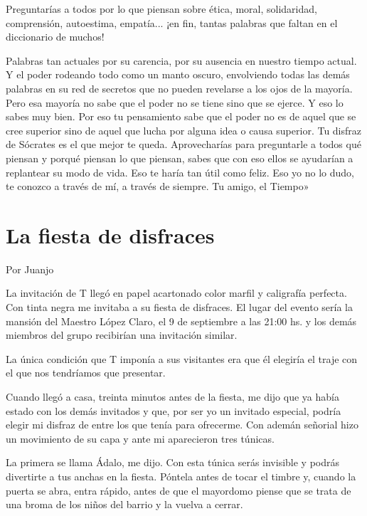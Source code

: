 \documentclass[11pt,twoside,openright,a5paper]{book}
\begin{document}
Preguntarías a todos por lo que piensan sobre ética, moral, solidaridad, comprensión, autoestima, empatía... ¡en fin, tantas palabras que faltan en el diccionario de muchos! 

Palabras tan actuales por su carencia, por su ausencia en nuestro tiempo actual. Y el poder rodeando todo como un manto oscuro, envolviendo todas las demás palabras en su red de secretos que no pueden revelarse a los ojos de la mayoría. Pero esa mayoría no sabe que el poder no se tiene sino que se ejerce. Y eso lo sabes muy bien. Por eso tu pensamiento sabe que el poder no es de aquel que se cree superior sino de aquel que lucha por alguna idea o causa superior. Tu disfraz de Sócrates es el que mejor te queda. Aprovecharías para preguntarle a todos qué piensan y porqué piensan lo que piensan, sabes que con eso ellos se ayudarían a replantear  su modo de vida. Eso te haría tan útil como feliz.  Eso yo no lo dudo, te conozco a través de mí, a través de  siempre. Tu amigo, el Tiempo»

\section*{La fiesta de disfraces}

                                                                                    \begin{flushright}Por Juanjo\end{flushright}

La invitación de T llegó en papel acartonado color marfil y caligrafía perfecta. Con tinta negra me invitaba a su fiesta de disfraces. El lugar del evento sería la mansión del Maestro López Claro, el 9 de septiembre a las 21:00 hs. y los demás miembros del grupo recibirían una invitación similar.

La única condición que T imponía a sus visitantes era que él elegiría el traje con el que nos tendríamos que presentar.

Cuando llegó a casa, treinta minutos antes de la fiesta, me dijo que ya había estado con los demás invitados y que, por ser yo un invitado especial, podría elegir mi disfraz de entre los que tenía para ofrecerme. Con ademán señorial hizo un movimiento de su capa y ante mi aparecieron tres túnicas.

La primera se llama Ádalo, me dijo. Con esta túnica serás invisible y podrás divertirte a tus anchas en la fiesta. Póntela antes de tocar el timbre y, cuando la puerta se abra, entra rápido, antes de que el mayordomo piense que se trata de una broma de los niños del barrio y la vuelva a cerrar.
\end{document}
